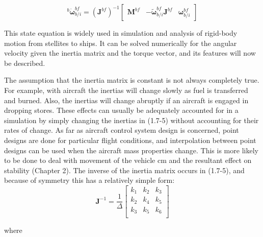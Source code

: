     \begin{equation}\tag{1.7-5}
    {^{b}{\dot{\mathbf{\omega}}^{bf}_{b/i}}} = {\left(\mathbf{J}^{bf}\right)}^{-1}
             \begin{bmatrix} \mathbf{M}^{bf} & - \tilde{\mathbf{\omega}}^{bf}_{b/i} \mathbf{J}^{bf} & \mathbf{\omega}^{bf}_{b/i} \end{bmatrix}
    \end{equation}

    This state equation is widely used in simulation and analysis of rigid-body motion from stellites to ships. It can be solved numerically for the angular velocity given the inertia matrix and the torque vector, and its features will now be described.

    The assumption that the inertia matrix is constant is not always completely true. For example, with aircraft the inertias will change slowly as fuel is transferred and burned. Also, the inertias will change abruptly if an aircraft is engaged in dropping stores. These effects can usually be adequately accounted for in a simulation by simply changing the inertias in (1.7-5) without accounting for their rates of change. As far as aircraft control system design is concerned, point designs are done for particular flight conditions, and interpolation between point designs can be used when the aircraft mass properties change. This is more likely to be done to deal with movement of the vehicle cm and the resultant effect on stability (Chapter 2).
    The inverse of the inertia matrix occurs in (1.7-5), and because of symmetry this has a relatively simple form:
    \begin{equation}\tag{1.7-6}
        \mathbf{J}^{-1} = \frac{1}{\Delta}
        \begin{bmatrix}
            k_{1} & k_{2} & k_{3} \\
            k_{2} & k_{4} & k_{5} \\
            k_{3} & k_{5} & k_{6} \\
        \end{bmatrix}
    \end{equation}

    where

